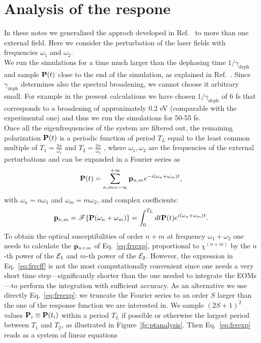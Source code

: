 \documentclass[submission, Phys]{SciPost}
\newcommand{\pp}{{\bf p}}
\newcommand{\PP}{{\bf P}}
\newcommand{\be}{\begin{equation}}
\newcommand{\ee}{\end{equation}}
\renewcommand{\[}{\left[}
\renewcommand{\]}{\right]}
\renewcommand{\(}{\left(}
\renewcommand{\)}{\right)}
\def\efield{\mathbf{\cal E}}
\def\susc#1{\chi^{(#1)}}
\begin{document}
\section{Analysis of the respone}
In these notes we generalized the approch developed in Ref.~\cite{Attaccalite2013} to more than one external field. Here we consider the perturbation of the laser fields with frequencies $\omega_1$ and $\omega_2$.\\
We run the simulations for a time much larger than the dephasing time $1/\gamma_{\text{deph}}$ and sample $\PP(t)$ close to the end of the simulation, as explained in Ref.~\cite{Attaccalite2013}.
Since $\gamma_{\text{deph}}$ determines also the spectral broadening, we cannot choose it arbitrary small. For example in the present calculations we have chosen $1/\gamma_{\text{deph}}$ of 6 fs that corresponds to a broadening of approximately 0.2 eV (comparable with the experimental one) and thus we run the simulations for 50-55 fs.\\
Once all the eigenfrequencies of the system are filtered out, the remaining polarization $\PP(t)$ is a periodic function of period $T_L$ equal to the least common multiple of $T_1=\frac{2\pi}{\omega_1}$ and  $T_2=\frac{2\pi}{\omega_2}$  , where $\omega_1,\omega_2$ are the frequencies of the external perturbations and can be expanded in a Fourier series as
\be\label{eq:frrexp}
\PP(t) = \sum_{n,m=-\infty}^{+\infty} \pp_{n,m} e^{-i(\omega_n+\omega_m) t},
\ee  
with $\omega_n = n \omega_1$ and $\omega_m = m \omega_2$, and complex coefficients:
\begin{equation}\label{eq:frrcff}
	\pp_{n,m}  = \mathscr{F}\{\PP(\omega_n+\omega_m)\} =\int_{0}^{T_L} dt \PP(t) e^{i(\omega_n + \omega_m) t}.
\end{equation}
To obtain the optical susceptibilities of order $n+m$ at frequency $\omega_1+\omega_2$ one needs to calculate the $\pp_{n+m}$ of Eq.~\eqref{eq:frrexp}, proportional to $\susc{n+m}$ by the $n$-th power of the $\efield_1$ and $m$-th power of the $\efield_2$. 
However, the expression in Eq.~\eqref{eq:frrcff} is not the most computationally convenient since one needs a very short time step---significantly shorter than the one needed to integrate the EOMs---to perform the integration with sufficient accuracy. As an alternative we use directly Eq.~\eqref{eq:frrexp}: we truncate the Fourier series to an order $S$ larger than the one of the response function we are interested in. We sample $(2S+1)^2$ values $\PP_i\equiv\PP(t_i)$ within a period $T_L$ if possible or otherwise the largest period between $T_1$ and $T_2$, as illustrated in Figure~\ref{fg:ptanalysis}. Then Eq.~\eqref{eq:frrexp} reads as a system of linear equations 
\end{document}
